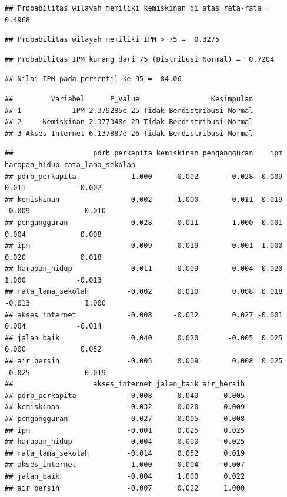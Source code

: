 \documentclass[
  12pt,
]{article}
\begin{document}
\begin{verbatim}
## Probabilitas wilayah memiliki kemiskinan di atas rata-rata =  0.4968
\end{verbatim}

\begin{verbatim}
## Probabilitas wilayah memiliki IPM > 75 =  0.3275
\end{verbatim}

\begin{verbatim}
## Probabilitas IPM kurang dari 75 (Distribusi Normal) =  0.7204
\end{verbatim}

\begin{verbatim}
## Nilai IPM pada persentil ke-95 =  84.06
\end{verbatim}

\begin{verbatim}
##         Variabel      P_Value                 Kesimpulan
## 1            IPM 2.379285e-25 Tidak Berdistribusi Normal
## 2     Kemiskinan 2.377348e-29 Tidak Berdistribusi Normal
## 3 Akses Internet 6.137887e-26 Tidak Berdistribusi Normal
\end{verbatim}

\begin{verbatim}
##                   pdrb_perkapita kemiskinan pengangguran    ipm harapan_hidup rata_lama_sekolah
## pdrb_perkapita             1.000     -0.002       -0.028  0.009         0.011            -0.002
## kemiskinan                -0.002      1.000       -0.011  0.019        -0.009             0.010
## pengangguran              -0.028     -0.011        1.000  0.001         0.004             0.008
## ipm                        0.009      0.019        0.001  1.000         0.020             0.018
## harapan_hidup              0.011     -0.009        0.004  0.020         1.000            -0.013
## rata_lama_sekolah         -0.002      0.010        0.008  0.018        -0.013             1.000
## akses_internet            -0.008     -0.032        0.027 -0.001         0.004            -0.014
## jalan_baik                 0.040      0.020       -0.005  0.025         0.000             0.052
## air_bersih                -0.005      0.009        0.008  0.025        -0.025             0.019
##                   akses_internet jalan_baik air_bersih
## pdrb_perkapita            -0.008      0.040     -0.005
## kemiskinan                -0.032      0.020      0.009
## pengangguran               0.027     -0.005      0.008
## ipm                       -0.001      0.025      0.025
## harapan_hidup              0.004      0.000     -0.025
## rata_lama_sekolah         -0.014      0.052      0.019
## akses_internet             1.000     -0.004     -0.007
## jalan_baik                -0.004      1.000      0.022
## air_bersih                -0.007      0.022      1.000
\end{verbatim}
\end{document}
